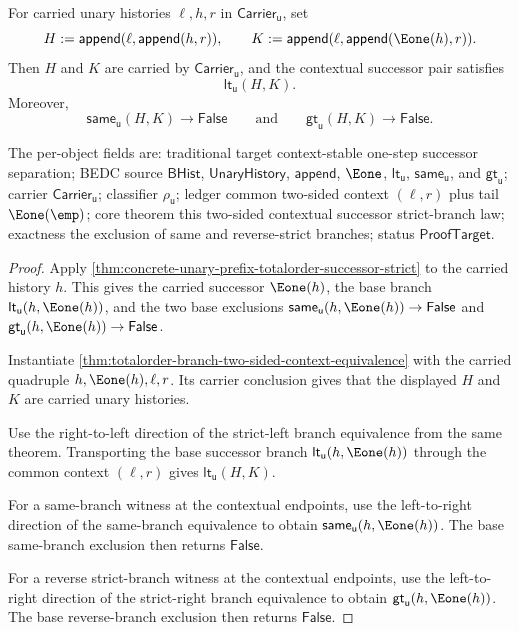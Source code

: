 \begin{theorem}
\label{thm:concrete-unary-prefix-totalorder-successor-two-sided-context-strict}
For carried unary histories $\ell,h,r$ in
$\mathsf{Carrier}_{\mathsf{u}}$, set
$$
H:=\mathsf{append}(\ell,\mathsf{append}(h,r)),
\qquad
K:=\mathsf{append}(\ell,\mathsf{append}(\Eone(h),r)).
$$
Then $H$ and $K$ are carried by $\mathsf{Carrier}_{\mathsf{u}}$, and the
contextual successor pair satisfies
$$
\mathsf{lt}_{\mathsf{u}}(H,K).
$$
Moreover,
$$
\mathsf{same}_{\mathsf{u}}(H,K)\to\mathsf{False}
\qquad
\text{and}
\qquad
\mathsf{gt}_{\mathsf{u}}(H,K)\to\mathsf{False}.
$$

The per-object fields are: traditional target context-stable one-step successor
separation; BEDC source $\mathsf{BHist}$, $\mathsf{UnaryHistory}$,
$\mathsf{append}$, $\Eone$, $\mathsf{lt}_{\mathsf{u}}$,
$\mathsf{same}_{\mathsf{u}}$, and $\mathsf{gt}_{\mathsf{u}}$; carrier
$\mathsf{Carrier}_{\mathsf{u}}$; classifier $\rho_{\mathsf{u}}$; ledger common
two-sided context $(\ell,r)$ plus tail $\Eone(\emp)$; core theorem this
two-sided contextual successor strict-branch law; exactness the exclusion of
same and reverse-strict branches; status $\mathsf{ProofTarget}$.
\end{theorem}
\begin{proof}
Apply
\autoref{thm:concrete-unary-prefix-totalorder-successor-strict} to the carried
history $h$. This gives the carried successor $\Eone(h)$, the base branch
$\mathsf{lt}_{\mathsf{u}}(h,\Eone(h))$, and the two base exclusions
$\mathsf{same}_{\mathsf{u}}(h,\Eone(h))\to\mathsf{False}$ and
$\mathsf{gt}_{\mathsf{u}}(h,\Eone(h))\to\mathsf{False}$.

Instantiate
\autoref{thm:totalorder-branch-two-sided-context-equivalence} with the carried
quadruple $h,\Eone(h),\ell,r$. Its carrier conclusion gives that the displayed
$H$ and $K$ are carried unary histories.

Use the right-to-left direction of the strict-left branch equivalence from the
same theorem. Transporting the base successor branch
$\mathsf{lt}_{\mathsf{u}}(h,\Eone(h))$ through the common context
$(\ell,r)$ gives $\mathsf{lt}_{\mathsf{u}}(H,K)$.

For a same-branch witness at the contextual endpoints, use the left-to-right
direction of the same-branch equivalence to obtain
$\mathsf{same}_{\mathsf{u}}(h,\Eone(h))$. The base same-branch exclusion then
returns $\mathsf{False}$.

For a reverse strict-branch witness at the contextual endpoints, use the
left-to-right direction of the strict-right branch equivalence to obtain
$\mathsf{gt}_{\mathsf{u}}(h,\Eone(h))$. The base reverse-branch exclusion then
returns $\mathsf{False}$.
\end{proof}

